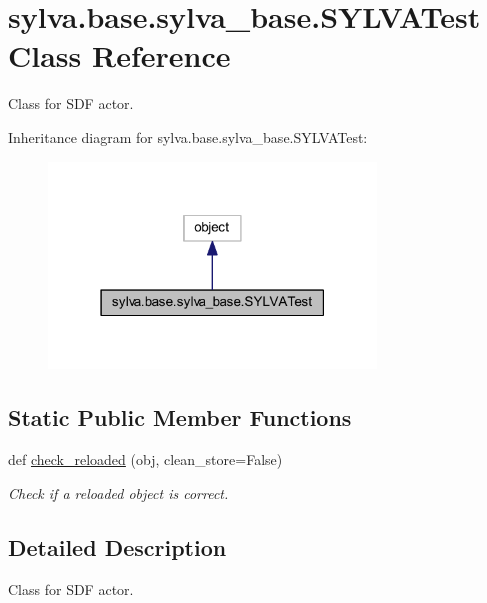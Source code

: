 \hypertarget{classsylva_1_1base_1_1sylva__base_1_1_s_y_l_v_a_test}{}\section{sylva.\+base.\+sylva\+\_\+base.\+S\+Y\+L\+V\+A\+Test Class Reference}
\label{classsylva_1_1base_1_1sylva__base_1_1_s_y_l_v_a_test}


Class for S\+DF actor.  




Inheritance diagram for sylva.\+base.\+sylva\+\_\+base.\+S\+Y\+L\+V\+A\+Test\+:\nopagebreak
\begin{figure}[H]
\begin{center}
\leavevmode
\includegraphics[width=247pt]{classsylva_1_1base_1_1sylva__base_1_1_s_y_l_v_a_test__inherit__graph}
\end{center}
\end{figure}
\subsection*{Static Public Member Functions}
\begin{DoxyCompactItemize}
\item 
def \hyperlink{classsylva_1_1base_1_1sylva__base_1_1_s_y_l_v_a_test_a5e38db786aebd04221fcaa2ab56a241d}{check\+\_\+reloaded} (obj, clean\+\_\+store=False)
\begin{DoxyCompactList}\small\item\em Check if a reloaded object is correct. \end{DoxyCompactList}\end{DoxyCompactItemize}


\subsection{Detailed Description}
Class for S\+DF actor. 



